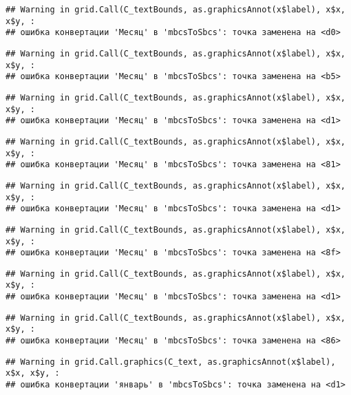 \documentclass[
]{article}
\begin{document}
\begin{verbatim}
## Warning in grid.Call(C_textBounds, as.graphicsAnnot(x$label), x$x, x$y, :
## ошибка конвертации 'Месяц' в 'mbcsToSbcs': точка заменена на <d0>
\end{verbatim}

\begin{verbatim}
## Warning in grid.Call(C_textBounds, as.graphicsAnnot(x$label), x$x, x$y, :
## ошибка конвертации 'Месяц' в 'mbcsToSbcs': точка заменена на <b5>
\end{verbatim}

\begin{verbatim}
## Warning in grid.Call(C_textBounds, as.graphicsAnnot(x$label), x$x, x$y, :
## ошибка конвертации 'Месяц' в 'mbcsToSbcs': точка заменена на <d1>
\end{verbatim}

\begin{verbatim}
## Warning in grid.Call(C_textBounds, as.graphicsAnnot(x$label), x$x, x$y, :
## ошибка конвертации 'Месяц' в 'mbcsToSbcs': точка заменена на <81>
\end{verbatim}

\begin{verbatim}
## Warning in grid.Call(C_textBounds, as.graphicsAnnot(x$label), x$x, x$y, :
## ошибка конвертации 'Месяц' в 'mbcsToSbcs': точка заменена на <d1>
\end{verbatim}

\begin{verbatim}
## Warning in grid.Call(C_textBounds, as.graphicsAnnot(x$label), x$x, x$y, :
## ошибка конвертации 'Месяц' в 'mbcsToSbcs': точка заменена на <8f>
\end{verbatim}

\begin{verbatim}
## Warning in grid.Call(C_textBounds, as.graphicsAnnot(x$label), x$x, x$y, :
## ошибка конвертации 'Месяц' в 'mbcsToSbcs': точка заменена на <d1>
\end{verbatim}

\begin{verbatim}
## Warning in grid.Call(C_textBounds, as.graphicsAnnot(x$label), x$x, x$y, :
## ошибка конвертации 'Месяц' в 'mbcsToSbcs': точка заменена на <86>
\end{verbatim}

\begin{verbatim}
## Warning in grid.Call.graphics(C_text, as.graphicsAnnot(x$label), x$x, x$y, :
## ошибка конвертации 'январь' в 'mbcsToSbcs': точка заменена на <d1>
\end{verbatim}
\end{document}
